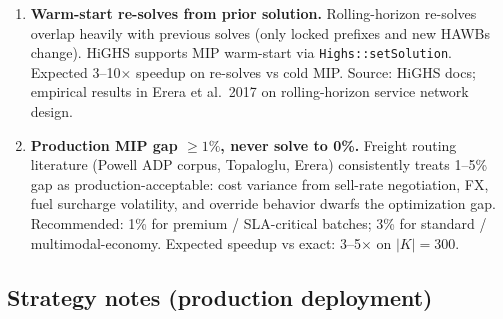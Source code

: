 \documentclass[11pt,a4paper]{article}
\theoremstyle{definition}
\begin{document}
\begin{enumerate}
        total parallel. Source: standard MCNF decomposition
        (Ahuja--Magnanti--Orlin \emph{Network Flows} \S17). BSA-contract
        coupling (\(C^{\text{eq}}\) chargeable accumulator across components)
        is the typical breaker --- measure \texttt{bsa\_coupling\_fraction}
        first; if high, plan for Lagrangian relaxation of just C.13a.
  \item \label{item:scale-warm-start} \textbf{Warm-start re-solves from
        prior solution.} Rolling-horizon re-solves overlap heavily with
        previous solves (only locked prefixes and new HAWBs change). HiGHS
        supports MIP warm-start via \texttt{Highs::setSolution}. Expected
        3--10$\times$ speedup on re-solves vs cold MIP. Source: HiGHS docs;
        empirical results in Erera et al.~2017 on rolling-horizon service
        network design.
  \item \label{item:scale-mip-gap} \textbf{Production MIP gap $\geq 1\%$,
        never solve to 0\%.} Freight routing literature (Powell ADP corpus,
        Topaloglu, Erera) consistently treats 1--5\% gap as
        production-acceptable: cost variance from sell-rate negotiation, FX,
        fuel surcharge volatility, and override behavior dwarfs the
        optimization gap. Recommended: 1\% for premium / SLA-critical
        batches; 3\% for standard / multimodal-economy. Expected speedup vs
        exact: 3--5$\times$ on $|K| = 300$.
\end{enumerate}

\subsection*{Strategy notes (production deployment)}
\end{document}
